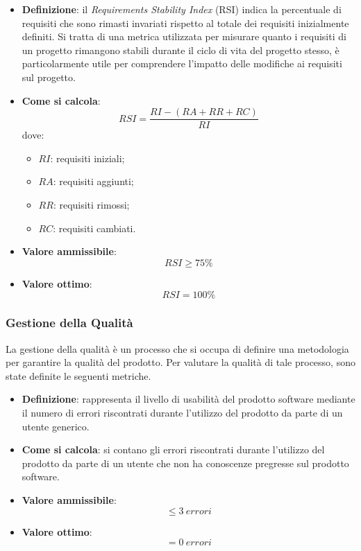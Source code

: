 \begin{itemize}
	\item \textbf{Definizione}: il \textit{Requirements Stability Index} (RSI) indica la percentuale di requisiti che sono rimasti invariati rispetto al totale dei requisiti inizialmente definiti. Si tratta di una metrica utilizzata per misurare quanto i requisiti di un progetto rimangono stabili durante il ciclo di vita del progetto stesso, è particolarmente utile per comprendere l'impatto delle modifiche ai requisiti sul progetto.
	\item \textbf{Come si calcola}: \begin{equation*}RSI = \frac{RI - (RA + RR + RC)}{RI}\end{equation*} dove:
		\begin{itemize}
			\item $RI$: requisiti iniziali;
			\item $RA$: requisiti aggiunti;
			\item $RR$: requisiti rimossi;
			\item $RC$: requisiti cambiati.
		\end{itemize}
	\item \textbf{Valore ammissibile}: \begin{equation*}RSI \geq 75\%\end{equation*}
	\item \textbf{Valore ottimo}: \begin{equation*}RSI = 100\%\end{equation*}
\end{itemize}


\subsubsection{Gestione della Qualità}
La gestione della qualità è un processo che si occupa di definire una metodologia per garantire la qualità del prodotto. Per valutare la qualità di tale processo, sono state definite le seguenti metriche.

\begin{itemize}
	\item \textbf{Definizione}: rappresenta il livello di usabilità del prodotto software mediante il numero di errori riscontrati durante l'utilizzo del prodotto da parte di un utente generico.
	\item \textbf{Come si calcola}: si contano gli errori riscontrati durante l'utilizzo del prodotto da parte di un utente che non ha conoscenze pregresse sul prodotto software.
	\item \textbf{Valore ammissibile}: \begin{equation*}\leq 3\ errori\end{equation*}
	\item \textbf{Valore ottimo}: \begin{equation*}= 0\ errori\end{equation*}
\end{itemize}

